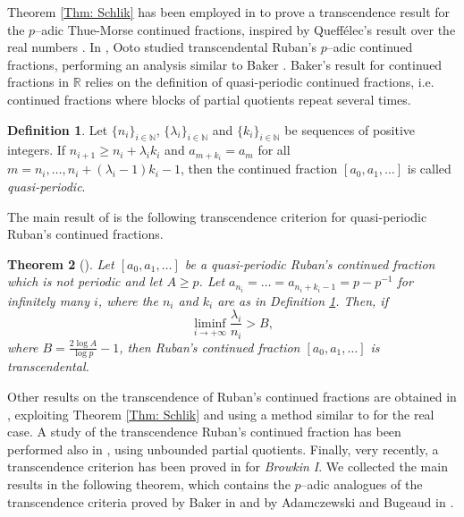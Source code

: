 \documentclass[12pt, reqno]{amsart}
\theoremstyle{plain}
\newtheorem{Theorem}{Theorem}
\theoremstyle{definition}
\newtheorem{Definition}[Theorem]{Definition}
\begin{document}
Theorem \ref{Thm: Schlik} has been employed in \cite{BEH} to prove a transcendence result for the $p$--adic Thue-Morse continued fractions, inspired by Queffélec's result over the real numbers \cite{QUE}. In \cite{OO}, Ooto studied transcendental Ruban's $p$--adic continued fractions, performing an analysis similar to Baker \cite{BAK}. Baker's result for continued fractions in $\mathbb{R}$ relies on the definition of quasi-periodic continued fractions, i.e. continued fractions where blocks of partial quotients repeat several times.
\begin{Definition}\label{Def: quasiper}
Let $\{n_i\}_{i\in\mathbb{N}}$, $\{\lambda_i\}_{i\in\mathbb{N}}$ and $\{k_i\}_{i\in\mathbb{N}}$ be sequences of positive integers. If $n_{i+1}\geq n_i+\lambda_ik_i$ and $a_{m+k_i}=a_m$ for all $m=n_i,\ldots,n_i+(\lambda_i-1)k_i-1$, then the continued fraction $[a_0,a_1,\ldots]$ is called \textit{quasi-periodic}. 
\end{Definition}

The main result of \cite{OO} is the following transcendence criterion for quasi-periodic Ruban's continued fractions.

\begin{Theorem}[\cite{OO}]
Let $[a_0,a_1,\ldots]$ be a quasi-periodic Ruban's continued fraction which is not periodic and let $A\geq p$. Let  $a_{n_i}=\ldots=a_{n_i+k_i-1}=p-p^{-1}$ for infinitely many $i$, where the $n_i$ and $k_i$ are as in Definition \ref{Def: quasiper}. Then, if
\[\liminf\limits_{i\rightarrow +\infty} \frac{\lambda_i}{n_i}>B,\]
where $B=\frac{2\log A}{\log p}-1$, then Ruban's continued fraction $[a_0,a_1,\ldots]$ is transcendental.
\end{Theorem}

Other results on the transcendence of Ruban's continued fractions are obtained in \cite{AMM1,AMM2}, exploiting Theorem \ref{Thm: Schlik} and using a method similar to \cite{ABD} for the real case. A study of the transcendence Ruban's continued fraction has been performed also in \cite{DL, LV, WANG, DEWII}, using unbounded partial quotients. Finally, very recently, a transcendence criterion has been proved in \cite{LMS} for \textit{Browkin I}. We collected the main results in the following theorem, which contains the $p$--adic analogues of the transcendence criteria proved by Baker in \cite{BAK} and by Adamczewski and Bugeaud in \cite{AB3}.
\end{document}
